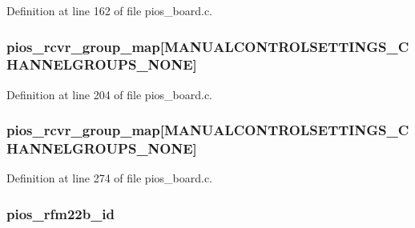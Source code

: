 Definition at line 162 of file pios\-\_\-board.\-c.

\hypertarget{group___open_pilot_core_ga6c6cfc16eb738e47c123298e062297e2}{
\subsubsection[{pios\-\_\-rcvr\-\_\-group\-\_\-map}]{ pios\-\_\-rcvr\-\_\-group\-\_\-map\mbox{[}M\-A\-N\-U\-A\-L\-C\-O\-N\-T\-R\-O\-L\-S\-E\-T\-T\-I\-N\-G\-S\-\_\-\-C\-H\-A\-N\-N\-E\-L\-G\-R\-O\-U\-P\-S\-\_\-\-N\-O\-N\-E\mbox{]}}}\label{group___open_pilot_core_ga6c6cfc16eb738e47c123298e062297e2}


Definition at line 204 of file pios\-\_\-board.\-c.

\hypertarget{group___open_pilot_core_ga6c6cfc16eb738e47c123298e062297e2}{
\subsubsection[{pios\-\_\-rcvr\-\_\-group\-\_\-map}]{ pios\-\_\-rcvr\-\_\-group\-\_\-map\mbox{[}M\-A\-N\-U\-A\-L\-C\-O\-N\-T\-R\-O\-L\-S\-E\-T\-T\-I\-N\-G\-S\-\_\-\-C\-H\-A\-N\-N\-E\-L\-G\-R\-O\-U\-P\-S\-\_\-\-N\-O\-N\-E\mbox{]}}}\label{group___open_pilot_core_ga6c6cfc16eb738e47c123298e062297e2}


Definition at line 274 of file pios\-\_\-board.\-c.

\hypertarget{group___open_pilot_core_ga1e0b7d2eb8b8640e07daa1f381780972}{
\subsubsection[{pios\-\_\-rfm22b\-\_\-id}]{ pios\-\_\-rfm22b\-\_\-id}}\label{group___open_pilot_core_ga1e0b7d2eb8b8640e07daa1f381780972}


